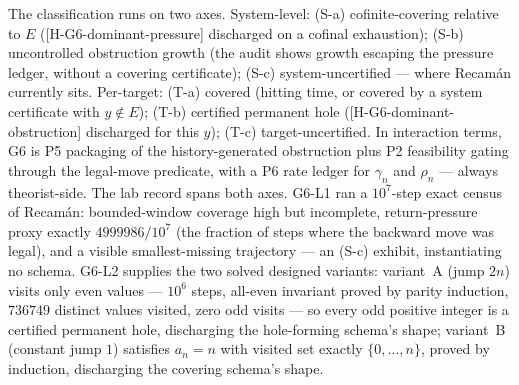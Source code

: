 \documentclass[11pt]{article}
\theoremstyle{definition}
\begin{document}
The classification runs on two axes. System-level: (S-a) cofinite-covering relative to $E$
(\textup{[H-G6-dominant-pressure]} discharged on a cofinal exhaustion); (S-b) uncontrolled
obstruction growth (the audit shows growth escaping the pressure ledger, without a covering
certificate); (S-c) system-uncertified --- where Recam\'an currently sits. Per-target: (T-a) covered
(hitting time, or covered by a system certificate with $y \notin E$); (T-b) certified permanent hole
(\textup{[H-G6-dominant-obstruction]} discharged for this $y$); (T-c) target-uncertified. In
interaction terms, G6 is P5 packaging of the history-generated obstruction plus P2 feasibility gating
through the legal-move predicate, with a P6 rate ledger for $\gamma_n$ and $\rho_n$ --- always
theorist-side. The lab record spans both axes. G6-L1 ran a $10^7$-step exact census of Recam\'an:
bounded-window coverage high but incomplete, return-pressure proxy exactly $4999986/10^7$ (the
fraction of steps where the backward move was legal), and a visible smallest-missing trajectory ---
an (S-c) exhibit, instantiating no schema. G6-L2 supplies the two solved designed variants: variant~A
(jump $2n$) visits only even values --- $10^6$ steps, all-even invariant proved by parity induction,
$736749$ distinct values visited, zero odd visits --- so every odd positive integer is a certified
permanent hole, discharging the hole-forming schema's shape; variant~B (constant jump $1$) satisfies
$a_n = n$ with visited set exactly $\{0, \ldots, n\}$, proved by induction, discharging the covering
schema's shape.
\end{document}
